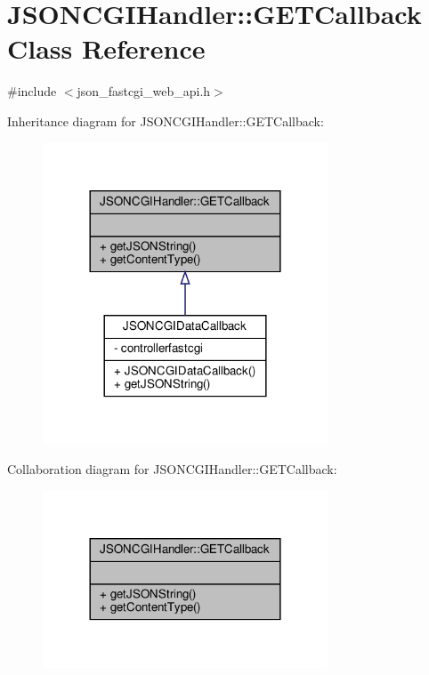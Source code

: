 \hypertarget{classJSONCGIHandler_1_1GETCallback}{}\section{J\+S\+O\+N\+C\+G\+I\+Handler\+:\+:G\+E\+T\+Callback Class Reference}
\label{classJSONCGIHandler_1_1GETCallback}


{\ttfamily \#include $<$json\+\_\+fastcgi\+\_\+web\+\_\+api.\+h$>$}



Inheritance diagram for J\+S\+O\+N\+C\+G\+I\+Handler\+:\+:G\+E\+T\+Callback\+:\nopagebreak
\begin{figure}[H]
\begin{center}
\leavevmode
\includegraphics[width=240pt]{classJSONCGIHandler_1_1GETCallback__inherit__graph}
\end{center}
\end{figure}


Collaboration diagram for J\+S\+O\+N\+C\+G\+I\+Handler\+:\+:G\+E\+T\+Callback\+:\nopagebreak
\begin{figure}[H]
\begin{center}
\leavevmode
\includegraphics[width=240pt]{classJSONCGIHandler_1_1GETCallback__coll__graph}
\end{center}
\end{figure}
